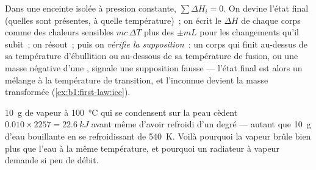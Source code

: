 \begin{method}\label{meth:b1:phase-changes:calorimetry}
Dans une enceinte isolée à pression constante, $\sum\Delta H_i = 0$. On devine
l'état final (quelles  sont présentes, à quelle température)~; on écrit
le $\Delta H$ de chaque corps comme des chaleurs sensibles $mc\,\Delta T$ plus
des  $\pm mL$ pour les changements qu'il subit~; on résout~;
puis on \emph{vérifie la supposition}~: un corps qui finit au-dessus de sa
température d'ébullition ou au-dessous de sa température de fusion, ou une
masse négative d'une , signale une supposition fausse --- l'état final
est alors un mélange à la température de transition, et l'inconnue devient la
masse transformée (\cref{ex:b1:first-law:ice}).
\end{method}

\begin{example}\label{ex:b1:phase-changes:steam}
\qty{10}{g} de vapeur à \qty{100}{\degreeCelsius} qui se condensent sur la
peau cèdent $0.010 \times 2257 = \qty{22.6}{kJ}$ avant même d'avoir refroidi
d'un degré --- autant que \qty{10}{g} d'eau bouillante en se refroidissant de
\qty{540}{K}. Voilà pourquoi la vapeur brûle bien plus que l'eau à la même
température, et pourquoi un radiateur à vapeur demande si peu de débit.
\end{example}

